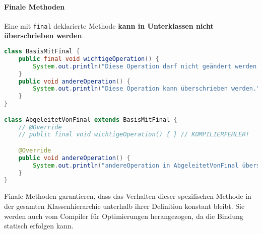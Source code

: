 \paragraph{Finale Methoden}
Eine mit \texttt{final} deklarierte Methode \textbf{kann in Unterklassen nicht überschrieben werden}.
\begin{lstlisting}[language=Java, caption={\texttt{final} Methode}, label=lst:final_methode, basicstyle=\ttfamily\footnotesize, breaklines=true, frame=tb]
class BasisMitFinal {
    public final void wichtigeOperation() {
        System.out.println("Diese Operation darf nicht geändert werden.");
    }
    public void andereOperation() {
        System.out.println("Diese Operation kann überschrieben werden.");
    }
}

class AbgeleitetVonFinal extends BasisMitFinal {
    // @Override
    // public final void wichtigeOperation() { } // KOMPILIERFEHLER!

    @Override
    public void andereOperation() {
        System.out.println("andereOperation in AbgeleitetVonFinal überschrieben.");
    }
}
\end{lstlisting}
Finale Methoden garantieren, dass das Verhalten dieser spezifischen Methode in der gesamten Klassenhierarchie unterhalb 
ihrer Definition konstant bleibt. Sie werden auch vom Compiler für Optimierungen herangezogen, da die Bindung statisch erfolgen kann.

